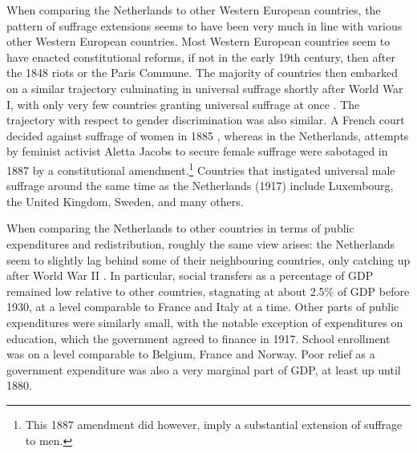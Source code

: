     When comparing the Netherlands to other Western European countries,  the pattern of suffrage extensions seems to have been very much in line with various other Western European countries. Most Western European countries seem to have enacted constitutional reforms, if not in the early 19th century, then after the 1848 riots or the Paris Commune. The majority of countries then embarked on a similar trajectory culminating in universal suffrage shortly after World War I, with only very few countries granting universal suffrage at once \autocite{caramani2017elections}. The trajectory with respect to gender discrimination was also similar. A French court decided against suffrage of women in 1885 \autocite{przeworski2009conquered}, whereas in the Netherlands, attempts by feminist activist Aletta Jacobs to secure female suffrage were sabotaged in 1887 by a constitutional amendment.\footnote{This 1887 amendment did however, imply a substantial extension of suffrage to men.} Countries that instigated universal male suffrage around the same time as the Netherlands (1917) include Luxembourg, the United Kingdom, Sweden, and many others. \autocite{caramani2017elections}

    When comparing the Netherlands to other countries in terms of public expenditures and redistribution, roughly the same view arises: the Netherlands seem to slightly lag behind some of their neighbouring countries, only catching up after World War II \autocite{lindert2004growing}. In particular, social transfers as a percentage of GDP remained low relative to other countries, stagnating at about 2.5\% of GDP before 1930, at a level comparable to France and Italy at a time. Other parts of public expenditures were similarly small, with the notable exception of expenditures on education, which the government agreed to finance in 1917. School enrollment was on a level comparable to Belgium, France and Norway. Poor relief as a government expenditure was also a very marginal part of GDP, at least up until 1880. \autocite{van2000eenheiddstaat, lindert2004growing}

